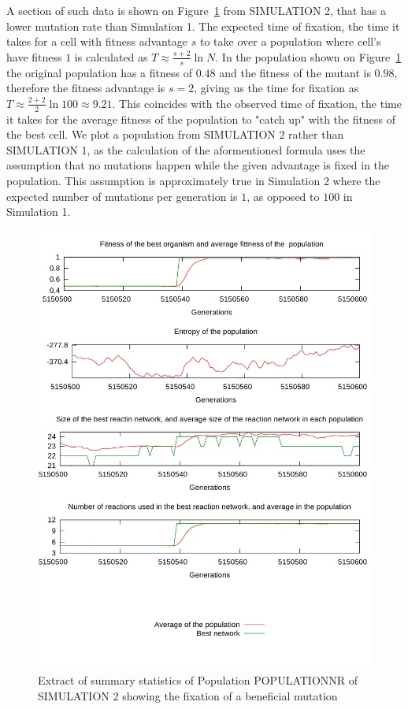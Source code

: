 \documentclass[10pt,a4paper]{article}
\begin{document}
A section of such data is shown on Figure~\ref{fig:fixation} from SIMULATION 2, that has a lower mutation rate than Simulation 1. The expected time of fixation, the time it takes for a cell with fitness advantage $s$ to take over a population where cell's have fitness $1$ is calculated as $T \approx \frac{s+2}{s}\ln N$. \cite{barteklecture} In the population shown on Figure~\ref{fig:fixation} the original population has a fitness of $0.48$ and the fitness of the mutant is $0.98$, therefore the fitness advantage is $s=2$, giving us the time for fixation as $T\approx \frac{2+2}{2}\ln 100 \approx 9.21$. This coincides with the observed time of fixation, the time it takes for the average fitness of the population to "catch up" with the fitness of the best cell. We plot a population from SIMULATION 2 rather than SIMULATION 1, as the calculation of the aformentioned formula uses the assumption that no mutations happen while the given advantage is fixed in the population. This assumption is approximately true in Simulation 2 where the expected number of mutations per generation is $1$, as opposed to $100$ in Simulation 1.

\begin{figure}[htpb]
	\centering
	\includegraphics[width=0.8\linewidth]{fixation.pdf}
	\caption{Extract of summary statistics of Population POPULATIONNR of SIMULATION 2 showing the fixation of a beneficial mutation}
	\label{fig:fixation}
\end{figure}
\end{document}
